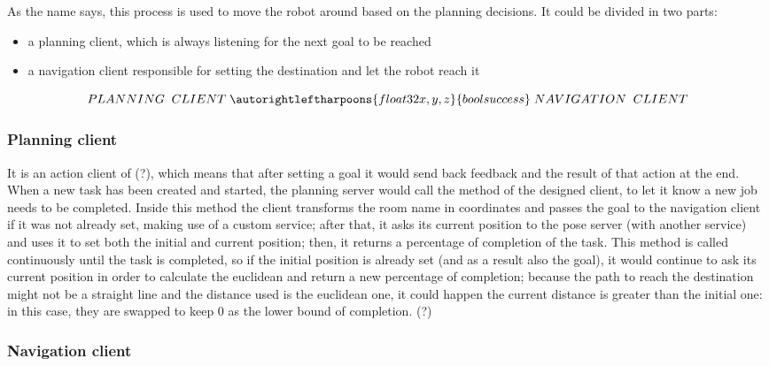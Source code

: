 As the name says, this process is used to move the robot around based on the planning decisions. It could be divided in two parts:

\begin{itemize}
    \item a planning client, which is always listening for the next goal to be reached
    \item a navigation client responsible for setting the destination and let the robot reach it
\end{itemize}

$$  
    PLANNING \;\; CLIENT \; 
        \autorightleftharpoons{float32 x, y, z}{bool success} \;
    NAVIGATION \;\; CLIENT
$$ 
    

\subsubsection*{Planning client}


It is an action client of  (?), which means that after setting a goal it would send back feedback and the result of that action at the end. When a new task has been created and started, the planning server would call the  method of the designed client, to let it know a new job needs to be completed.
Inside this method the client transforms the room name in coordinates and passes the goal to the navigation client if it was not already set, making use of a custom service; after that, it asks its current position to the pose server (with another service) and uses it to set both the initial and current position; then, it returns a percentage of completion of the task. This method is called continuously until the task is completed, so if the initial position is already set (and as a result also the goal), it would continue to ask its current position in order to calculate the euclidean and return a new percentage of completion; because the path to reach the destination might not be a straight line and the distance used is the euclidean one, it could happen the current distance is greater than the initial one: in this case, they are swapped to keep 0 as the lower bound of completion. (?)

\subsubsection*{Navigation client}

